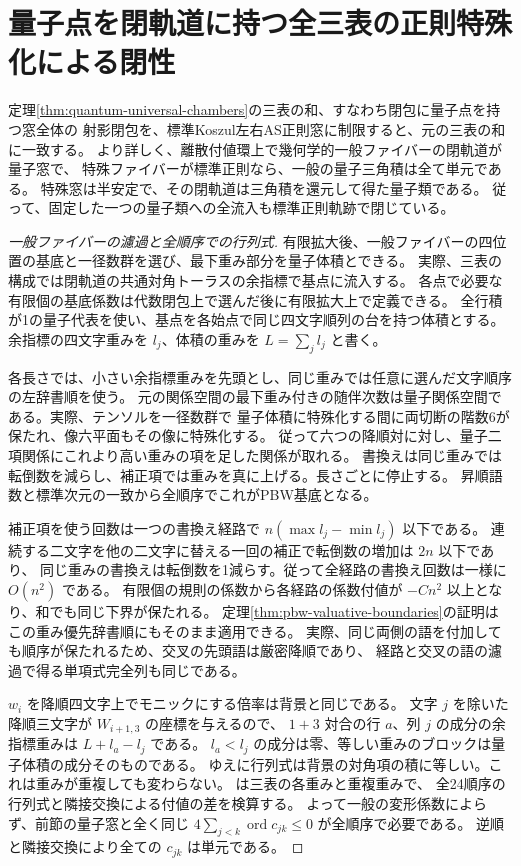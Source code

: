 \section{量子点を閉軌道に持つ全三表の正則特殊化による閉性}
\label{sec:quantum-regular-closure}
\begin{theorem}\label{thm:quantum-regular-closure}
定理\ref{thm:quantum-universal-chambers}の三表の和、すなわち閉包に量子点を持つ窓全体の
射影閉包を、標準Koszul左右AS正則窓に制限すると、元の三表の和に一致する。
より詳しく、離散付値環上で幾何学的一般ファイバーの閉軌道が量子窓で、
特殊ファイバーが標準正則なら、一般の量子三角積は全て単元である。
特殊窓は半安定で、その閉軌道は三角積を還元して得た量子類である。
従って、固定した一つの量子類への全流入も標準正則軌跡で閉じている。
\end{theorem}
\begin{proof}[一般ファイバーの濾過と全順序での行列式]
有限拡大後、一般ファイバーの四位置の基底と一径数群を選び、最下重み部分を量子体積とできる。
実際、三表の構成では閉軌道の共通対角トーラスの余指標で基点に流入する。
各点で必要な有限個の基底係数は代数閉包上で選んだ後に有限拡大上で定義できる。
全行積が1の量子代表を使い、基点を各始点で同じ四文字順列の台を持つ体積とする。
余指標の四文字重みを $l_j$、体積の重みを $L=\sum_j l_j$ と書く。

各長さでは、小さい余指標重みを先頭とし、同じ重みでは任意に選んだ文字順序の左辞書順を使う。
元の関係空間の最下重み付きの随伴次数は量子関係空間である。実際、テンソルを一径数群で
量子体積に特殊化する間に両切断の階数6が保たれ、像六平面もその像に特殊化する。
従って六つの降順対に対し、量子二項関係にこれより高い重みの項を足した関係が取れる。
書換えは同じ重みでは転倒数を減らし、補正項では重みを真に上げる。長さごとに停止する。
昇順語数と標準次元の一致から全順序でこれがPBW基底となる。

補正項を使う回数は一つの書換え経路で $n(\max l_j-\min l_j)$ 以下である。
連続する二文字を他の二文字に替える一回の補正で転倒数の増加は $2n$ 以下であり、
同じ重みの書換えは転倒数を1減らす。従って全経路の書換え回数は一様に $O(n^2)$ である。
有限個の規則の係数から各経路の係数付値が $-Cn^2$ 以上となり、和でも同じ下界が保たれる。
定理\ref{thm:pbw-valuative-boundaries}の証明はこの重み優先辞書順にもそのまま適用できる。
実際、同じ両側の語を付加しても順序が保たれるため、交叉の先頭語は厳密降順であり、
経路と交叉の語の濾過で得る単項式完全列も同じである。

$w_i$ を降順四文字上でモニックにする倍率は背景と同じである。
文字 $j$ を除いた降順三文字が $W_{i+1,3}$ の座標を与えるので、
$1+3$ 対合の行 $a$、列 $j$ の成分の余指標重みは $L+l_a-l_j$ である。
$l_a<l_j$ の成分は零、等しい重みのブロックは量子体積の成分そのものである。
ゆえに行列式は背景の対角項の積に等しい。これは重みが重複しても変わらない。
 は三表の各重みと重複重みで、
全24順序の行列式と隣接交換による付値の差を検算する。
よって一般の変形係数によらず、前節の量子窓と全く同じ
$4\sum_{j<k}\operatorname{ord}c_{jk}\le0$ が全順序で必要である。
逆順と隣接交換により全ての $c_{jk}$ は単元である。
\end{proof}
